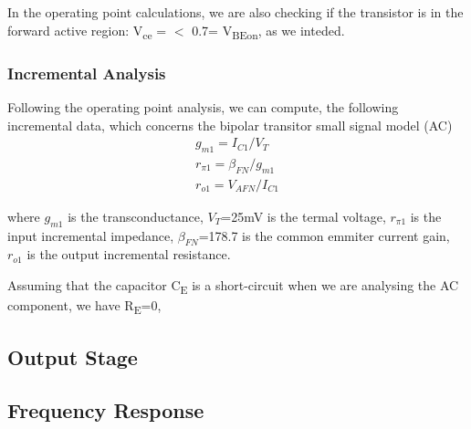 In the operating point calculations, we are also checking if the transistor is in the forward active region:  V\textsubscript{ce} =  $<$ 0.7= V\textsubscript{BEon}, as we inteded.
\subsubsection{Incremental Analysis}
Following the operating point analysis, we can compute, the following incremental data, which concerns the bipolar transitor small signal model (AC)
\begin{align*} 
g_{m1}= I_{C1}/V_{T}\\
r_{\pi 1}=\beta_{FN}/g_{m1}\\
r_{o 1}=V_{AFN}/I_{C1}
\end{align*}

where $g_{m1}$ is the transconductance, $V_{T}$=25mV is the termal voltage, $r_{\pi 1}$ is the input incremental impedance, $\beta_{FN}$=178.7 is the common emmiter current gain, $r_{o 1}$ is the output incremental resistance.

Assuming that the capacitor C\textsubscript{E} is a short-circuit when we are analysing the AC component, we have R\textsubscript{E}=0,

\subsection{Output Stage}

\subsection{Frequency Response}




